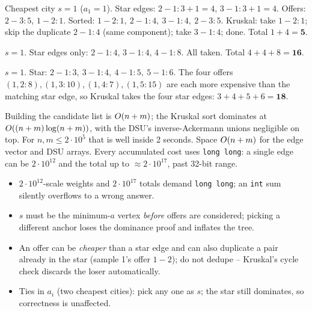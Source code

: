 \begin{tracebox}[Sample 1: \, \(n=3\), \(m=2\), \(a=(1,3,3)\), offers \((2,3,5),(1,2,1)\)]
Cheapest city \(s=1\) (\(a_1=1\)).  Star edges: \(2\!-\!1{:}3+1=4\),
\(3\!-\!1{:}3+1=4\).  Offers: \(2\!-\!3{:}5\), \(1\!-\!2{:}1\).  Sorted:
\(1\!-\!2{:}1,\ 2\!-\!1{:}4,\ 3\!-\!1{:}4,\ 2\!-\!3{:}5\).  Kruskal: take
\(1\!-\!2{:}1\); skip the duplicate \(2\!-\!1{:}4\) (same component); take
\(3\!-\!1{:}4\); done.  Total \(1+4=\mathbf{5}\).
\end{tracebox}
\begin{tracebox}[Sample 2: \, \(n=4\), \(m=0\), \(a=(1,3,3,7)\)]
\(s=1\).  Star edges only: \(2\!-\!1{:}4\), \(3\!-\!1{:}4\), \(4\!-\!1{:}8\).
All taken.  Total \(4+4+8=\mathbf{16}\).
\end{tracebox}
\begin{tracebox}[Sample 3: \, \(n=5\), \(m=4\), \(a=(1,2,3,4,5)\), offers all costlier than the star]
\(s=1\).  Star: \(2\!-\!1{:}3,\ 3\!-\!1{:}4,\ 4\!-\!1{:}5,\ 5\!-\!1{:}6\).  The
four offers \((1,2{:}8),(1,3{:}10),(1,4{:}7),(1,5{:}15)\) are each more expensive
than the matching star edge, so Kruskal takes the four star edges:
\(3+4+5+6=\mathbf{18}\).
\end{tracebox}

\begin{complexitybox}
Building the candidate list is \(O(n+m)\); the Kruskal sort dominates at
\(O((n+m)\log(n+m))\), with the DSU's inverse-Ackermann unions negligible on
top.  For \(n,m\le 2\cdot 10^5\) that is well inside 2 seconds.  Space
\(O(n+m)\) for the edge vector and DSU arrays.  Every accumulated cost uses
\texttt{long long}: a single edge can be \(2\cdot 10^{12}\) and the total up to
\(\approx 2\cdot 10^{17}\), past 32-bit range.
\end{complexitybox}

\begin{hardeningbox}
\begin{itemize}[nosep,leftmargin=1.4em]
\item \(2\cdot 10^{12}\)-scale weights and \(2\cdot 10^{17}\) totals demand
      \texttt{long long}; an \texttt{int} sum silently overflows to a wrong answer.
\item \(s\) must be the minimum-\(a\) vertex \emph{before} offers are considered;
      picking a different anchor loses the dominance proof and inflates the tree.
\item An offer can be \emph{cheaper} than a star edge and can also duplicate a
      pair already in the star (sample 1's offer \(1\!-\!2\)); do not dedupe --
      Kruskal's cycle check discards the loser automatically.
\item Ties in \(a_i\) (two cheapest cities): pick any one as \(s\); the star still
      dominates, so correctness is unaffected.
\end{itemize}
\end{hardeningbox}

